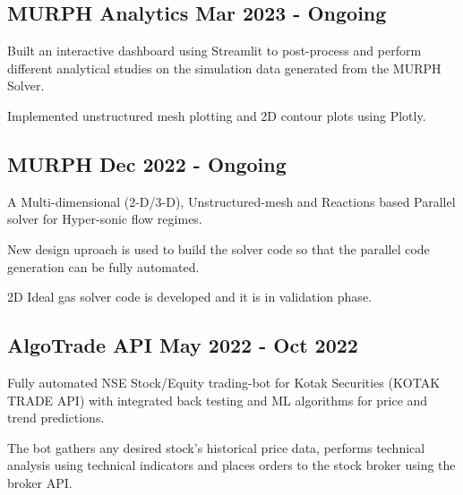 \subsection{{MURPH Analytics \hfill Mar 2023 - Ongoing}}
\begin{zitemize}
\item {Built an interactive dashboard using Streamlit to post-process and perform different analytical studies on the simulation data generated from the MURPH Solver.}
\item {Implemented unstructured mesh plotting and 2D contour plots using Plotly.}
\end{zitemize}


\subsection{{MURPH \hfill Dec 2022 - Ongoing}}
\begin{zitemize}
\item {A Multi-dimensional (2-D/3-D), Unstructured-mesh and Reactions based Parallel solver for Hyper-sonic flow regimes.}
\item {New design uproach is used to build the solver code so that the parallel code generation can be fully automated.}
\item {2D Ideal gas solver code is developed and it is in validation phase.}
\end{zitemize}


\subsection{{AlgoTrade API \hfill May 2022 - Oct 2022}}
\begin{zitemize}
\item {Fully automated NSE Stock/Equity trading-bot for Kotak Securities (KOTAK TRADE API) with integrated back testing and ML algorithms for price and trend predictions.}
\item {The bot gathers any desired stock's historical price data, performs technical analysis using technical indicators and places orders to the stock broker using the broker API.}
\end{zitemize}


